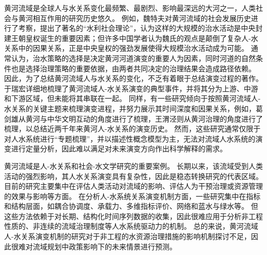 
黄河流域是全球人与水关系变化最频繁、最剧烈、影响最深远的大河之一，人类社会与黄河相互作用的研究历史悠久。
例如，魏特夫对黄河流域的社会发展历史进行了考察，提出了著名的“水利社会理论”，认为这样的大规模的治水活动是中央封建王朝皇权诞生的重要因素\cite{weitefu1989}；但许多中国学者认为魏氏的观点是颠倒了复杂人-水关系中的因果关系，正是中央皇权的强劲发展使得大规模治水活动成为可能\cite{jizhaoding1981}。
通常认为，治水策略的选择是决定黄河河道演变的重要人为因素，同时河道的自然条件也是选择治理策略的重要依据，由两者共同决定的治理结果会造成路径依赖\cite{WangWeiJing2009}。
因此，为了总结黄河流域人与水关系的变化，不乏有着眼于总结演变过程的著作。
于瑞宏详细地梳理了黄河流域人-水关系演变的典型事件，并将其分为上游、中游和下游区域，但未能将其串联在一起\cite{yuruihong2011}。
同样，有一些研究倾向于按照黄河流域人-水关系的关键主题来梳理演变进程，并努力展示其时间深度和因果关系，例如，葛剑雄从黄河与中华文明互动的角度进行了梳理\cite{gejianxiong2020}，王渭泾则从黄河治理的角度进行了梳理\cite{WangWeiJing2009}，以总结近两千年来黄河人-水关系的演变历史。
然而，这些研究通常仅限于对人水系统进行“专题梳理”，并以描述性概念模型为主，无法对流域人水系统的演变进行定量分析，因此难以满足对未来演变方向作出科学解释的需求。

黄河流域是人-水关系和社会-水文学研究的重要案例。
长期以来，该流域受到人类活动的强烈影响，其人水关系演变具有复杂性，因此是稳态转换研究的代表区域\cite{zuo2022, wang2014}。
目前的研究主要集中在评估人类活动对流域的影响、评估人为干预治理或资源管理的效果与影响等方面\cite{wang2016a, WuXuTong2021, wang2019c}。
在分析人-水系统关系演变机制方面，一些研究集中在指标和结构层面，如耦合协调度\cite{libo2022}、承载力\cite{wang2022d}、多维指标评价\cite{li2020}、网络\cite{song2022}和蓝水与绿水等\cite{zhuo2016a}。
但这些方法依赖于对长期、结构化时间序列数据的收集，因此很难应用于分析非工程性质的、非连续的流域治理制度等人水系统驱动力的机制。
总的来说，黄河流域人-水关系演变机制的研究对于非工程的水资源治理措施的影响机制探讨不足，因此很难对流域规划中政策影响下的未来情景进行预测。

